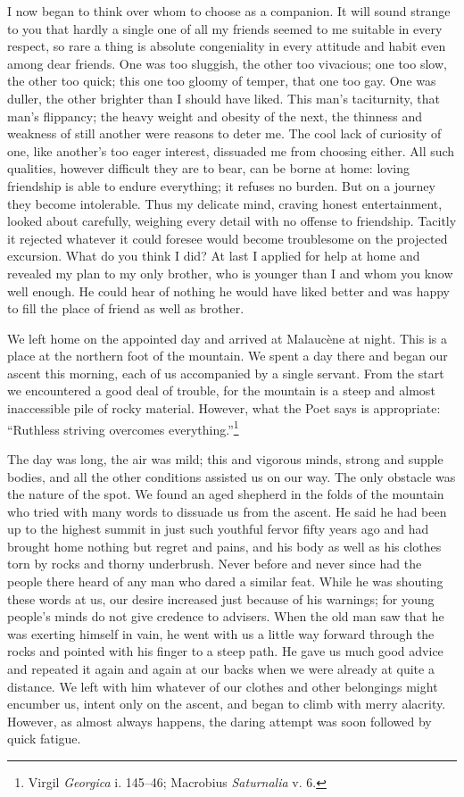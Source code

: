 I now began to think over whom to choose as a companion. It will sound
strange to you that hardly a single one of all my friends seemed to me
suitable in every respect, so rare a thing is absolute congeniality in
every attitude and habit even among dear friends. One was too
sluggish, the other too vivacious; one too slow, the other too quick;
this one too gloomy of temper, that one too gay. One was duller, the
other brighter than I should have liked. This man's taciturnity, that
man's flippancy; the heavy weight and obesity of the next, the
thinness and weakness of still another were reasons to deter me. The
cool lack of curiosity of one, like another's too eager interest,
dissuaded me from choosing either. All such qualities, however
difficult they are to bear, can be borne at home: loving friendship is
able to endure everything; it refuses no burden. But on a journey they
become intolerable. Thus my delicate mind, craving honest
entertainment, looked about carefully, weighing every detail with no
offense to friendship. Tacitly it rejected whatever it could foresee
would become troublesome on the projected excursion.  What do
you think I did? At last I applied for help at home and revealed my
plan to my only brother, who is younger than I and whom you know well
enough. He could hear of nothing he would have liked better and was
happy to fill the place of friend as well as brother.

We left home on the appointed day and arrived at Malauc\`{e}ne at
night. This is a place at the northern foot of the mountain. We spent
a day there and began our ascent this morning, each of us accompanied
by a single servant. From the start we encountered a good deal of
trouble, for the mountain is a steep and almost inaccessible pile of
rocky material. However, what the Poet says is appropriate: ``Ruthless
striving overcomes everything.''\footnote{Virgil \textit{Georgica} i.
145--46; Macrobius \textit{Saturnalia} v. 6.}

The day was long, the air was mild; this and vigorous minds, strong
and supple bodies, and all the other conditions assisted us on our
way. The only obstacle was the nature of the spot. We found an aged
shepherd in the folds of the mountain who tried with many words to
dissuade us from the ascent. He said he had been up to the highest
summit in just such youthful fervor fifty years ago and had brought
home nothing but regret and pains, and his body as well as his clothes
torn by rocks and thorny underbrush. Never before and never since had
the people there heard of any man who dared a similar feat. While he
was shouting these words at us, our desire increased just because of
his warnings; for young people's minds do not give credence to
advisers. When the old man saw that he was exerting himself in vain,
he went with us a little way forward through the rocks and pointed
with his finger to a steep path. He gave us much good advice and
repeated it again and again at our backs when we were already at
quite a distance. We left with him whatever of our clothes and other
belongings might encumber us, intent only on the ascent, and began to
climb with merry alacrity. However, as almost always happens, the
daring attempt was soon followed by quick fatigue.

